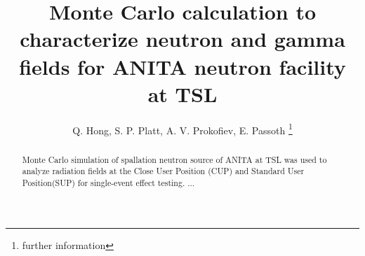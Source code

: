 \documentclass[11pt,a4paper]{IEEEtran}
\begin{document}
\title{Monte Carlo calculation to characterize neutron and gamma fields for ANITA neutron facility at TSL}

\author{Q. Hong,
S. P. Platt,
A. V. Prokofiev,
E. Passoth
\thanks{further information}\\[2mm] 	%
\vspace{-5mm}
}



\maketitle %

\begin{abstract}
Monte Carlo simulation of spallation neutron source of ANITA at TSL was used to analyze radiation fields at the Close User Position (CUP) and Standard User Position(SUP) for single-event effect testing. ...
\end{abstract}




\IEEEpeerreviewmaketitle
\end{document}
